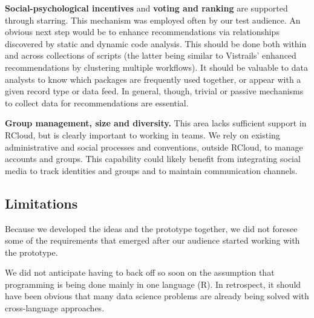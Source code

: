 {\bf Social-psychological incentives} and {\bf voting and ranking}
are supported through starring. This mechanism was employed often
by our test audience. An obvious next step would be to enhance
recommendations via relationships discovered by static and
dynamic code analysis. This should be done both within and across
collections of scripts (the latter being similar to Vistrails'
enhanced recommendations by clustering multiple workflows).
It should be valuable to data analysts to know which packages are
frequently used together, or appear with a given record type
or data feed. In general, though, trivial or passive mechanisms
to collect data for recommendations are essential.

{\bf Group management, size and diversity.} This area lacks sufficient
support in RCloud, but is clearly important to working in teams.
We rely on existing administrative and social processes and conventions,
outside RCloud, to manage accounts and groups. This capability
could likely benefit from integrating social media to track
identities and groups and to maintain communication channels.

\subsection{Limitations}

Because we developed the ideas and the prototype together,
we did not foresee some of the requirements that emerged
after our audience started working with the prototype.

We did not anticipate having to back off so soon on the
assumption that programming is being done mainly in one
language (R). In retrospect, it should have been obvious
that many data science problems are already being solved
with cross-language approaches.

